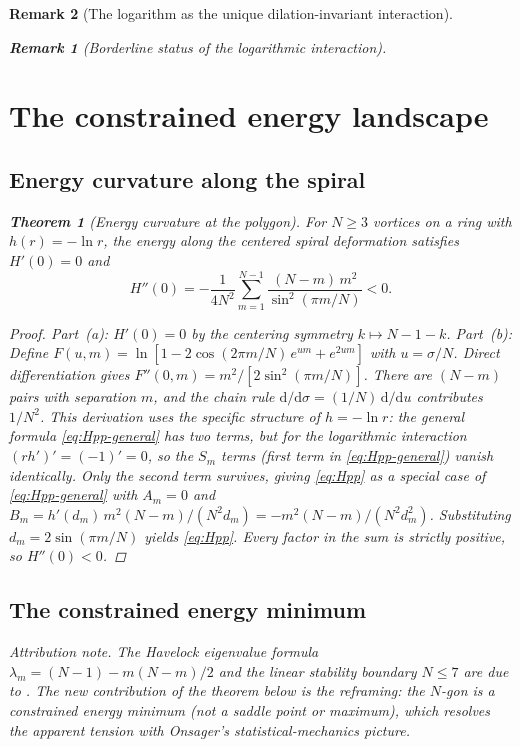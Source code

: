\documentclass[12pt, a4paper]{article}
\newtheorem{theorem}{Theorem}[section]
\newtheorem{remark}{Remark}[section]
\numberwithin{equation}{section}
\newcommand{\dd}{\mathrm{d}}
\begin{document}
\begin{remark}[The logarithm as the unique dilation-invariant interaction]
\begin{remark}[Borderline status of the logarithmic interaction]
\section{The constrained energy landscape}
\label{sec:energy-landscape}

\subsection{Energy curvature along the spiral}

\begin{theorem}[Energy curvature at the polygon]\label{thm:energy-curv}
For $N \ge 3$ vortices on a ring with $h(r) = -\ln r$, the energy
along the centered spiral deformation satisfies $H'(0) = 0$ and
\begin{equation}\label{eq:Hpp}
  H''(0) = -\frac{1}{4N^2}\sum_{m=1}^{N-1}
    \frac{(N-m)\,m^2}{\sin^2(\pi m/N)} < 0.
\end{equation}
\end{theorem}

\begin{proof}
Part~(a): $H'(0) = 0$ by the centering symmetry $k \mapsto N-1-k$.
Part~(b): Define $F(u, m) = \ln[1 - 2\cos(2\pi m/N)\,e^{um} + e^{2um}]$
with $u = \sigma/N$.  Direct differentiation gives
$F''(0, m) = m^2/[2\sin^2(\pi m/N)]$.
There are $(N-m)$ pairs with separation $m$, and the chain rule
$\dd/\dd\sigma = (1/N)\,\dd/\dd u$ contributes $1/N^2$.
This derivation uses the specific structure of $h = -\ln r$:
the general formula \eqref{eq:Hpp-general} has two terms, but for the
logarithmic interaction $(rh')' = (-1)' = 0$, so the $S_m$ terms
(first term in \eqref{eq:Hpp-general}) vanish identically.  Only the
second term survives, giving \eqref{eq:Hpp} as a special case of
\eqref{eq:Hpp-general} with $A_m = 0$ and
$B_m = h'(d_m)\,m^2(N{-}m)/(N^2 d_m) = -m^2(N{-}m)/(N^2 d_m^2)$.
Substituting $d_m = 2\sin(\pi m/N)$ yields \eqref{eq:Hpp}.
Every factor in the sum is strictly positive, so $H''(0) < 0$.
\end{proof}

\subsection{The constrained energy minimum}

\noindent\emph{Attribution note.}
The Havelock eigenvalue formula $\lambda_m = (N{-}1) - m(N{-}m)/2$
and the linear stability boundary $N \le 7$ are due to
\citet{Havelock1931}.  The new contribution of the theorem below is
the reframing: the $N$-gon is a \emph{constrained energy minimum}
(not a saddle point or maximum), which resolves the apparent tension
with Onsager's statistical-mechanics picture.


\end{remark}
\end{remark}
\end{document}
